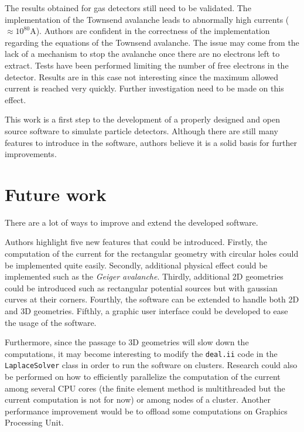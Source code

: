 \documentclass[11pt]{article}
\begin{document}
	The results obtained for gas detectors still need to be validated. The
	implementation of the Townsend avalanche leads to abnormally high currents
	($\approx 10^{80}$A). Authors are confident in the correctness of the implementation
	regarding the equations of the Townsend avalanche. The issue may come from the
	lack of a mechanism to stop the avalanche once there are no electrons left
	to extract. Tests have been performed limiting the number of free electrons in
	the detector. Results are in this case not interesting since the maximum allowed
	current is reached very quickly. Further investigation need to be made on this
	effect.

	This work is a first step to the development of a properly designed and open source
	software to simulate particle detectors. Although there are still
	many features to introduce in the software, authors believe it is a solid
	basis for further improvements.



	\section*{Future work}

		There are a lot of ways to improve and extend the developed software.

		Authors highlight five new features that could be introduced. Firstly, the
		computation of the current for the
		rectangular geometry with circular holes could be implemented quite easily.
		Secondly, additional physical effect
		could be implemented such as the \textit{Geiger avalanche}. Thirdly,
		additional 2D geometries could be introduced such as
		rectangular potential sources but with gaussian curves at their corners.
		Fourthly, the software can be extended to handle both 2D and 3D geometries.
		Fifthly, a graphic user interface could be developed to ease the usage of the
		software.

		Furthermore, since the passage to 3D geometries will slow down the computations,
		it may become interesting to modify the \texttt{deal.ii} code in the
		\texttt{LaplaceSolver} class in order to run the software on clusters.
		Research could also be performed on how to efficiently parallelize the
		computation of the current among several CPU cores (the finite element method
		is multithreaded but the current computation is not for now) or among nodes of a cluster.
		Another performance improvement would be to offload some computations on
		Graphics Processing Unit.
\end{document}

